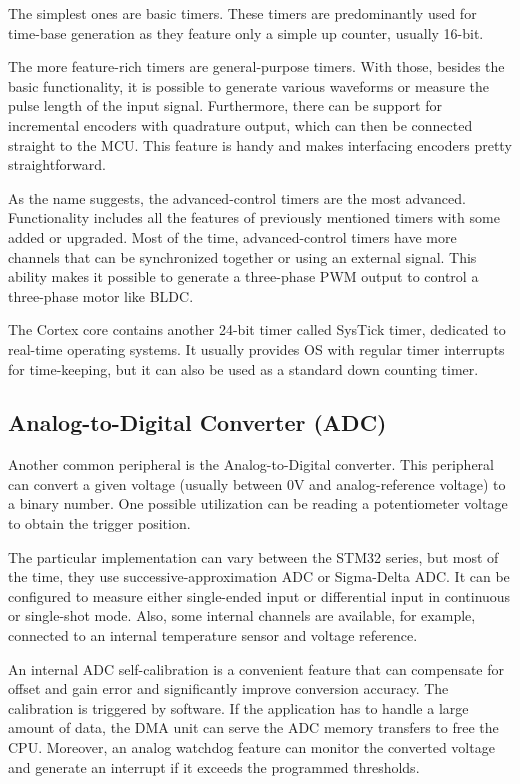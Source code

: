 The simplest ones are basic timers. These timers are predominantly used for time-base generation as they feature only a simple up counter, usually 16-bit.

The more feature-rich timers are general-purpose timers. With those, besides the basic functionality, it is possible to generate various waveforms or measure the pulse length of the input signal. Furthermore, there can be support for incremental encoders with quadrature output, which can then be connected straight to the MCU. This feature is handy and makes interfacing encoders pretty straightforward.

As the name suggests, the advanced-control timers are the most advanced. Functionality includes all the features of previously mentioned timers with some added or upgraded. Most of the time, advanced-control timers have more channels that can be synchronized together or using an external signal. This ability makes it possible to generate a three-phase PWM output to control a three-phase motor like BLDC.

The Cortex core contains another 24-bit timer called SysTick timer, dedicated to real-time operating systems. It usually provides OS with regular timer interrupts for time-keeping, but it can also be used as a standard down counting timer.

	\subsection{Analog-to-Digital Converter (ADC)}
	\label{sub:adc}
Another common peripheral is the Analog-to-Digital converter. This peripheral can convert a given voltage (usually between 0V and analog-reference voltage) to a binary number. One possible utilization can be reading a potentiometer voltage to obtain the trigger position.

The particular implementation can vary between the STM32 series, but most of the time, they use successive-approximation ADC or Sigma-Delta ADC. It can be configured to measure either single-ended input or differential input in continuous or single-shot mode. Also, some internal channels are available, for example, connected to an internal temperature sensor and voltage reference.

An internal ADC self-calibration is a convenient feature that can compensate for offset and gain error and significantly improve conversion accuracy. The calibration is triggered by software. If the application has to handle a large amount of data, the DMA unit can serve the ADC memory transfers to free the CPU. Moreover, an analog watchdog feature can monitor the converted voltage and generate an interrupt if it exceeds the programmed thresholds. 

